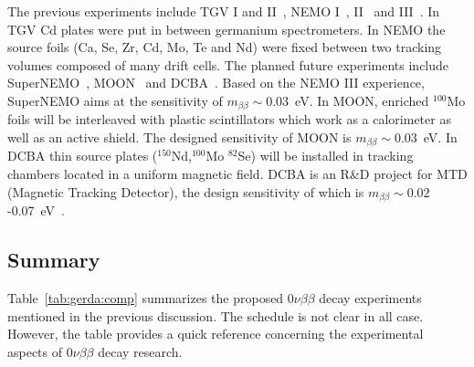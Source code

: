The previous experiments include TGV I and II~\cite{Ste98, Ste00,   Ste06}, NEMO I~\cite{Das91}, II~\cite{Arn95} and III~\cite{Arn05,   Arn07}. In TGV Cd plates were put in between germanium spectrometers.  In NEMO the source foils (Ca, Se, Zr, Cd, Mo, Te and Nd) were fixed between two tracking volumes composed of many drift cells. The planned future experiments include SuperNEMO~\cite{Sne08}, MOON~\cite{Nak06} and DCBA~\cite{Ish05}. Based on the NEMO III experience, SuperNEMO aims at the sensitivity of $m_{\beta\beta} \sim 0.03$~eV. In MOON, enriched $^{100}$Mo foils will be interleaved with plastic scintillators which work as a calorimeter as well as an active shield.  The designed sensitivity of MOON is $m_{\beta\beta} \sim 0.03$~eV. In DCBA thin source plates ($^{150}$Nd,$^{100}$Mo $^{82}$Se) will be installed in tracking chambers located in a uniform magnetic field. DCBA is an R\&D project for MTD (Magnetic Tracking Detector), the design sensitivity of which is $m_{\beta\beta} \sim 0.02$-0.07~eV~\cite{Ish07}.

\subsection{Summary}
\label{sec:exp:comp}
Table~\ref{tab:gerda:comp} summarizes the proposed $0\nu\beta\beta$ decay experiments mentioned in the previous discussion. The schedule is not clear in all case. However, the table provides a quick reference concerning the experimental aspects of $0\nu\beta\beta$ decay research.

